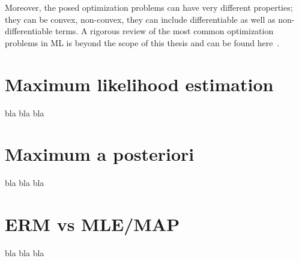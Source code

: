 Moreover, the posed optimization problems can have very different properties; they can be convex, non-convex, they can include differentiable as well as non-differentiable terms. A rigorous review of the most common optimization problems in ML is beyond the scope of this thesis and can be found here~\cite{boyd2004convex, bach2012optimization, sra2012optimization, nesterov2013introductory}.


\section{Maximum likelihood estimation} \label{sec:mle}
bla bla bla

\section{Maximum a posteriori} \label{sec:map}
bla bla bla

\section{ERM vs MLE/MAP} \label{sec:erm-mlemap_connection}
bla bla bla